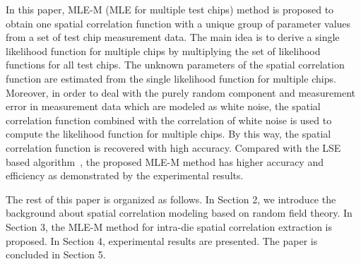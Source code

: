 \documentclass[referee]{ieice}
\begin{document}
In this paper, MLE-M (MLE for multiple test chips) method is proposed to
obtain one spatial correlation function with a unique group of
parameter values from a set of test chip measurement data. The main
idea is to derive a single likelihood function for multiple chips by
multiplying the set of likelihood functions for all test chips. The
unknown parameters of the spatial correlation function are estimated
from the single likelihood function for multiple chips. Moreover, in
order to deal with the purely random component and measurement error
in measurement data which are modeled as white noise, the spatial
correlation function combined with the correlation of white noise is
used to compute the likelihood function for multiple chips. By this
way, the spatial correlation function is recovered with high
accuracy. Compared with the LSE based algorithm~\cite{Xiong07}, the
proposed MLE-M method has higher accuracy and efficiency as
demonstrated by the experimental results.


The rest of this paper is organized as follows. In Section 2, we
introduce the background about spatial correlation modeling based on
random field theory. In Section 3, the MLE-M method for intra-die
spatial correlation extraction is
proposed. In Section 4, experimental results are presented. The paper is concluded  %
in Section 5.
\end{document}
